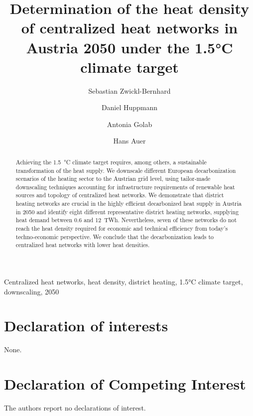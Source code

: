 \documentclass[review]{elsarticle}
\begin{document}
\begin{frontmatter}

\title{Determination of the heat density of centralized heat networks in Austria 2050 under the 1.5°C climate target}
\author[1,2]{Sebastian Zwickl-Bernhard}
\author[2]{Daniel Huppmann}
\author[1]{Antonia Golab}
\author[1]{Hans Auer}
\address[1]{Energy Economics Group (EEG), Technische Universität Wien, Gusshausstrasse 25-29/E370-3, 1040 Wien, Austria}
\address[2]{Energy, Climate and Environment (ECE) Program,  International Institute for Applied Systems Analysis (IIASA), Laxenburg, Austria}

\begin{abstract}
	Achieving the \SI{1.5}{\degreeCelsius} climate target requires, among others, a sustainable transformation of the heat supply. We downscale different European decarbonization scenarios of the heating sector to the Austrian grid level, using tailor-made downscaling techniques accounting for infrastructure requirements of renewable heat sources and topology of centralized heat networks. We demonstrate that district heating networks are crucial in the highly efficient decarbonized heat supply in Austria in 2050 and identify eight different representative district heating networks, supplying heat demand between \SI{0.6}{} and \SI{12}{TWh}. Nevertheless, seven of these networks do not reach the heat density required for economic and technical efficiency from today's techno-economic perspective. We conclude that the decarbonization leads to centralized heat networks with lower heat densities. 
\end{abstract}

\begin{keyword}
	Centralized heat networks, heat density, district heating, 1.5°C climate target, downscaling, 2050
\end{keyword}
\end{frontmatter}

\newpage

\newpage

\newpage






\section*{Declaration of interests}
None.
\section*{Declaration of Competing Interest}
The authors report no declarations of interest.
\end{document}
